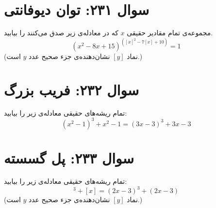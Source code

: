 \documentclass[12pt]{article}
\begin{document}
\section*{سوال ۲۳۱: توان دیوفانتی}
مجموعه‌ی تمام مقادیر حقیقی \(x\) که در معادله‌ی زیر صدق می‌کنند را بیابید.
\begin{displaymath}
	(x^2 - 8x + 15)^{([x]^2 - 7[x] + 10)} = 1
\end{displaymath}
(نماد \( [y] \) نشان‌دهنده‌ی جزء صحیح عدد \(y\) است.)

\vspace{1cm}
\hrulefill
\vspace{1cm}

\section*{سوال ۲۳۲: فریب بزرگ}
تمام ریشه‌های حقیقی معادله‌ی زیر را بیابید:
\begin{displaymath}
	(x^2 - 1)^3 + x^2 - 1 = (3x - 3)^3 + 3x - 3
\end{displaymath}

\vspace{1cm}
\hrulefill
\vspace{1cm}

\section*{سوال ۲۳۳: پل گسسته}
تمام ریشه‌های حقیقی معادله‌ی زیر را بیابید:
\begin{displaymath}
	[x]^3 + [x] = (2x - 3)^3 + (2x - 3)
\end{displaymath}
(نماد \( [y] \) نشان‌دهنده‌ی جزء صحیح عدد \(y\) است.)

\vspace{1cm}
\hrulefill
\vspace{1cm}

\end{document}
